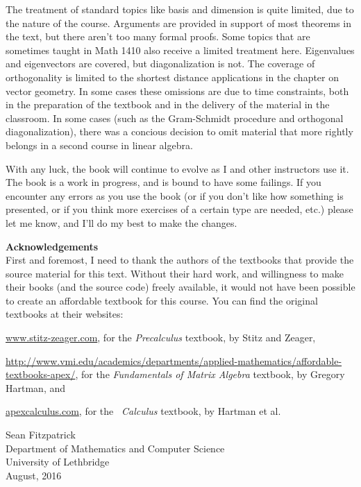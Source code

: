 The treatment of standard topics like basis and dimension is quite limited, due to the nature of the course. Arguments are provided in support of most theorems in the text, but there aren't too many formal proofs. Some topics that are sometimes taught in Math 1410 also receive a limited treatment here. Eigenvalues and eigenvectors are covered, but diagonalization is not. The coverage of orthogonality is limited to the shortest distance applications in the chapter on vector geometry. In some cases these omissions are due to time constraints, both in the preparation of the textbook and in the delivery of the material in the classroom. In some cases (such as the Gram-Schmidt procedure and orthogonal diagonalization), there was a concious decision to omit material that more rightly belongs in a second course in linear algebra.

With any luck, the book will continue to evolve as I and other instructors use it. The book is a work in progress, and is bound to have some failings. If you encounter any errors as you use the book (or if you don't like how something is presented, or if you think more exercises of a certain type are needed, etc.) please let me know, and I'll do my best to make the changes. 



\pagebreak

\noindent\textbf{\large Acknowledgements}\\

First and foremost, I need to thank the authors of the textbooks that provide the source material for this text. Without their hard work, and willingness to make their books (and the source code) freely available, it would not have been possible to create an affordable textbook for this course. You can find the original textbooks at their websites:

\bigskip


\href{http://www.stitz-zeager.com}{www.stitz-zeager.com}, for the \textit{Precalculus} textbook, by Stitz and Zeager, 

\bigskip

\href{http://www.vmi.edu/academics/departments/applied-mathematics/affordable-textbooks-apex/}{http://www.vmi.edu/academics/departments/applied-mathematics/affordable-textbooks-apex/}, for the \textit{Fundamentals of Matrix Algebra} textbook, by Gregory Hartman, and

\bigskip

\href{http://www.apexcalculus.com}{apexcalculus.com}, for the \apex\ \textit{Calculus} textbook, by Hartman et al.



\vspace{1in}

\begin{raggedright}
Sean Fitzpatrick\\
Department of Mathematics and Computer Science\\
University of Lethbridge\\
August, 2016
\end{raggedright}




